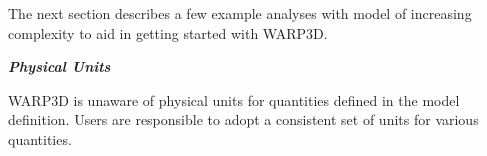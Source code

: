 \documentclass[11pt]{report}
\numberwithin{equation}{section}
\newcommand{\ti}{\emph}
\newcommand{\nid}{\noindent}
\begin{document}
The next section describes a few example analyses with model of
increasing complexity to aid in getting started with WARP3D.

\nid \textbf{\ti{Physical Units}}

WARP3D is unaware of physical units for quantities defined in the model
definition.  Users are responsible to adopt a consistent set of 
units for various quantities.
\end{document}
